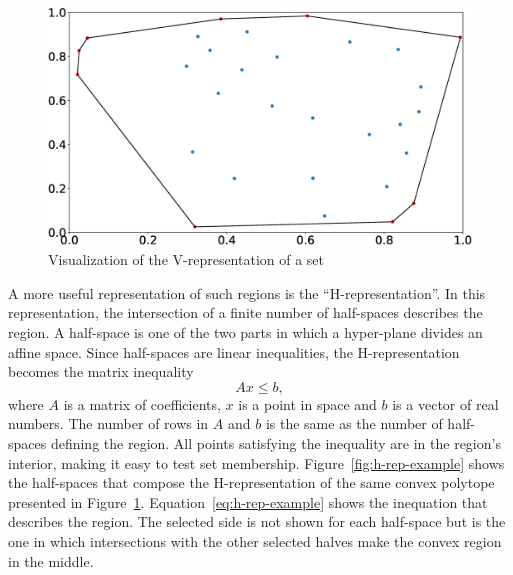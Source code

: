 \begin{figure}[!htb]
	\centering
	\includegraphics[width=\linewidth]{imgs/v-rep}
	\caption{Visualization of the V-representation of a set}%
	\label{fig:v-rep-example}
\end{figure}

A more useful representation of such regions is the \enquote{H-representation}.
In this representation, the intersection of a finite number of half-spaces
describes the region. A half-space is one of the two parts in which a
hyper-plane divides an affine space. Since half-spaces are linear inequalities,
the H-representation becomes the matrix inequality
%
\begin{equation}
	Ax\leq{}b,
\end{equation}
%
where \(A\) is a matrix of coefficients, \(x\) is a point in space and \(b\) is
a vector of real numbers. The number of rows in \(A\) and \(b\) is the same as
the number of half-spaces defining the region. All points satisfying the
inequality are in the region's interior, making it easy to test set membership.
Figure~\ref{fig:h-rep-example} shows the half-spaces that compose the
H-representation of the same convex polytope presented in
Figure~\ref{fig:v-rep-example}. Equation~\ref{eq:h-rep-example} shows the
inequation that describes the region. The selected side is not shown for each
half-space but is the one in which intersections with the other selected halves
make the convex region in the middle.

